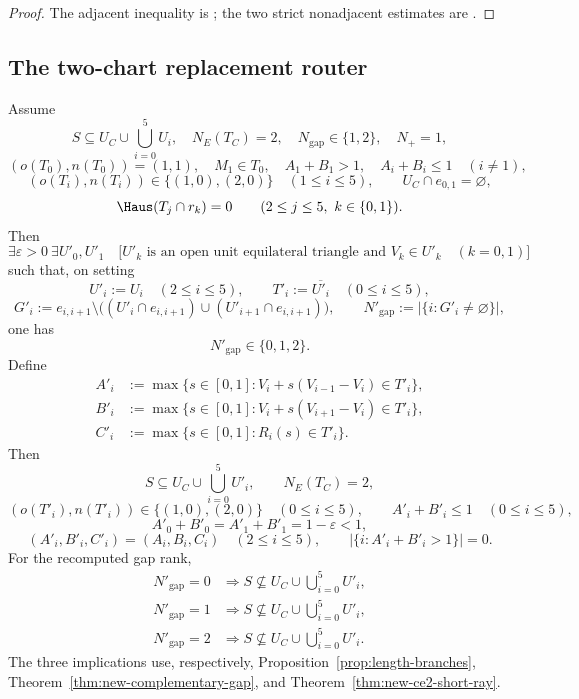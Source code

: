 \begin{proof}
The adjacent inequality is ; the two
strict nonadjacent estimates are .
\end{proof}

\subsection{The two-chart replacement router}

\begin{proposition}
\label{prop:finite-two-chart-router}
Assume
\[
 S\subseteq U_C\cup\bigcup_{i=0}^5U_i,
 \quad N_E(T_C)=2,
 \quad N_{\mathrm{gap}}\in\{1,2\},
 \quad N_+=1,
\]
\[
 (o(T_0),n(T_0))=(1,1),
 \quad M_1\in T_0,
 \quad A_1+B_1>1,
 \quad A_i+B_i\le1\quad(i\ne1),
\]
\[
 (o(T_i),n(T_i))\in\{(1,0),(2,0)\}\quad(1\le i\le5),
 \qquad U_C\cap e_{0,1}=\varnothing,
\]
\[
 \Haus(T_j\cap r_k)=0
 \qquad(2\le j\le5,\ k\in\{0,1\}).
\]
Then
\[
 \exists\varepsilon>0\ \exists U'_0,U'_1\quad
 \bigl[U'_k\text{ is an open unit equilateral triangle and }V_k\in U'_k
 \quad(k=0,1)\bigr]
\]
such that, on setting
\[
 U'_i:=U_i\quad(2\le i\le5),
 \qquad T'_i:=\overline{U'_i}\quad(0\le i\le5),
\]
\[
 G'_i:=e_{i,i+1}\setminus
 \bigl((U'_i\cap e_{i,i+1})\cup(U'_{i+1}\cap e_{i,i+1})\bigr),
 \qquad N'_{\mathrm{gap}}:=|\{i:G'_i\ne\varnothing\}|,
\]
one has
\[
 N'_{\mathrm{gap}}\in\{0,1,2\}.
\]
Define
\[
 \begin{aligned}
 A'_i&:=\max\{s\in[0,1]:V_i+s(V_{i-1}-V_i)\in T'_i\},\\
 B'_i&:=\max\{s\in[0,1]:V_i+s(V_{i+1}-V_i)\in T'_i\},\\
 C'_i&:=\max\{s\in[0,1]:R_i(s)\in T'_i\}.
 \end{aligned}
\]
Then
\[
 S\subseteq U_C\cup\bigcup_{i=0}^5U'_i,
 \qquad N_E(T_C)=2,
\]
\[
 (o(T'_i),n(T'_i))\in\{(1,0),(2,0)\}\quad(0\le i\le5),
 \qquad A'_i+B'_i\le1\quad(0\le i\le5),
\]
\[
 A'_0+B'_0=A'_1+B'_1=1-\varepsilon<1,
\]
\[
 (A'_i,B'_i,C'_i)=(A_i,B_i,C_i)\quad(2\le i\le5),
 \qquad |\{i:A'_i+B'_i>1\}|=0.
\]
For the recomputed gap rank,
\[
 \begin{aligned}
 N'_{\mathrm{gap}}=0&\Longrightarrow
 S\nsubseteq U_C\cup\bigcup_{i=0}^5U'_i,\\
 N'_{\mathrm{gap}}=1&\Longrightarrow
 S\nsubseteq U_C\cup\bigcup_{i=0}^5U'_i,\\
 N'_{\mathrm{gap}}=2&\Longrightarrow
 S\nsubseteq U_C\cup\bigcup_{i=0}^5U'_i.
 \end{aligned}
\]
The three implications use, respectively,
Proposition~\ref{prop:length-branches},
Theorem~\ref{thm:new-complementary-gap}, and
Theorem~\ref{thm:new-ce2-short-ray}.
\end{proposition}

